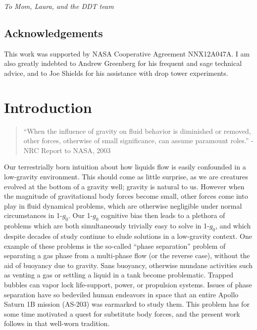 \documentclass[12pt,a4paper,oneside]{book}
\newcommand\blankpage{%
    \null
    \thispagestyle{empty}%
    \addtocounter{page}{-1}%
    \newpage}
\begin{document}
\emph{To Mom, Laura, and the DDT team}\\
\vspace*{\fill}

\clearpage


\vspace*{\fill}
\section*{Acknowledgements}

This work was supported by NASA Cooperative Agreement NNX12A047A. I am also greatly indebted to Andrew Greenberg for his frequent and sage technical advice, and to Joe Shields for his assistance with drop tower experiments. \\ 
\vspace*{\fill}
\clearpage

\tableofcontents
\afterpage{\blankpage}
\listoffigures
\afterpage{\blankpage}

\doublespacing
\mainmatter
\chapter{Introduction}
\begin{quote}
``When the influence of gravity on fluid behavior is diminished or removed, other forces, otherwise of small significance, can assume paramount roles.''
- NRC Report to NASA, 2003\cite{motil_priorities_2012}
\end{quote}

Our terrestrially born intuition about how liquids flow is easily confounded in a low-gravity environment. This should come as little surprise, as we are creatures evolved at the bottom of a gravity well; gravity is natural to us. However when the magnitude of gravitational body forces become small, other forces come into play in fluid dynamical problems, which are otherwise negligible under normal circumstances in 1-$g_0$. Our 1-$g_0$ cognitive bias then leads to a plethora of problems which are both simultaneously trivially easy to solve in 1-$g_0$, and which despite decades of study continue to elude solutions in a low-gravity context. One example of these problems is the so-called ``phase separation'' problem of separating a gas phase from a multi-phase flow (or the reverse case), without the aid of buoyancy due to gravity. Sans buoyancy, otherwise mundane activities such as venting a gas or settling a liquid in a tank become problematic\cite{petrash_controlling_1964}. Trapped bubbles can vapor lock life-support, power, or propulsion systems\cite{jenson_passive_2014}. Issues of phase separation have so bedeviled human endeavors in space that an entire Apollo Saturn 1B mission (AS-203) was earmarked to study them\cite{hastings_saturn_1965}. This problem has for some time motivated a quest for substitute body forces, and the present work follows in that well-worn tradition.
\end{document}

